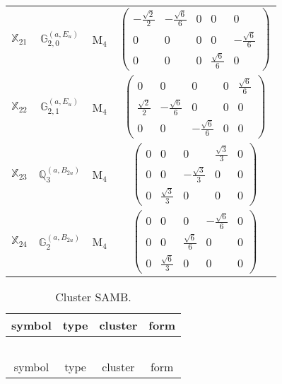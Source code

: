 \documentclass[fleqn,10pt,landscape]{article}
\begin{document}
\begin{itemize}
\begin{center}
\begin{longtable}{c|c|c|c}
$ \mathbb{X}_{21} $ & $\mathbb{G}_{2,0}^{(a,E_{u})}$ & M$_{4}$ & $\begin{pmatrix} - \frac{\sqrt{2}}{2} & - \frac{\sqrt{6}}{6} & 0 & 0 & 0 \\ 0 & 0 & 0 & 0 & - \frac{\sqrt{6}}{6} \\ 0 & 0 & 0 & \frac{\sqrt{6}}{6} & 0 \end{pmatrix}$ \\
$ \mathbb{X}_{22} $ & $\mathbb{G}_{2,1}^{(a,E_{u})}$ & M$_{4}$ & $\begin{pmatrix} 0 & 0 & 0 & 0 & \frac{\sqrt{6}}{6} \\ \frac{\sqrt{2}}{2} & - \frac{\sqrt{6}}{6} & 0 & 0 & 0 \\ 0 & 0 & - \frac{\sqrt{6}}{6} & 0 & 0 \end{pmatrix}$ \\
$ \mathbb{X}_{23} $ & $\mathbb{Q}_{3}^{(a,B_{2u})}$ & M$_{4}$ & $\begin{pmatrix} 0 & 0 & 0 & \frac{\sqrt{3}}{3} & 0 \\ 0 & 0 & - \frac{\sqrt{3}}{3} & 0 & 0 \\ 0 & \frac{\sqrt{3}}{3} & 0 & 0 & 0 \end{pmatrix}$ \\
$ \mathbb{X}_{24} $ & $\mathbb{G}_{2}^{(a,B_{2u})}$ & M$_{4}$ & $\begin{pmatrix} 0 & 0 & 0 & - \frac{\sqrt{6}}{6} & 0 \\ 0 & 0 & \frac{\sqrt{6}}{6} & 0 & 0 \\ 0 & \frac{\sqrt{6}}{3} & 0 & 0 & 0 \end{pmatrix}$ \\
\end{longtable}
\end{center}
\begin{center}
\renewcommand{\arraystretch}{1.3}
\begin{longtable}{c|c|c|c}
\caption{Cluster SAMB.}
 \\
 \hline \hline
symbol & type & cluster & form \\ \hline \endfirsthead

\multicolumn{3}{l}{\tablename\ \thetable{}} \\
 \hline \hline
symbol & type & cluster & form \\ \hline \endhead


\end{longtable}
\end{center}
\end{itemize}
\end{document}

